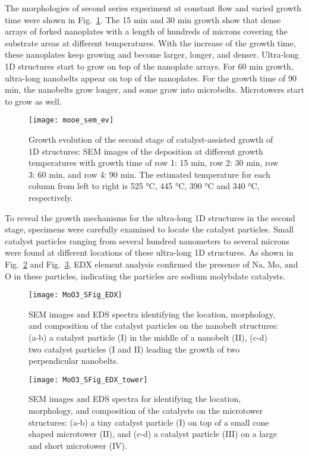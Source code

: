 The morphologies of second series experiment at constant  flow and varied growth time were shown in Fig.~\ref{fig:ch4ev}. The 15 min and 30 min growth show that dense arrays of  forked nanoplates with a length of hundreds of microns covering the substrate areas at different temperatures. With the increase of the growth time, these nanoplates keep growing and become larger, longer, and denser. Ultra-long 1D  structures start to grow on top of the nanoplate arrays. For 60 min growth, ultra-long nanobelts appear on top of the nanoplates. For the growth time of 90 min, the nanobelts grow longer, and some grow into microbelts. Microtowers start to grow as well.

\begin{figure}[htb]
\centering
\texttt{[image: mooe\_sem\_ev]}
\caption[Growth evolution of : second stage]{Growth evolution of the second stage of catalyst-assisted growth of  1D structures: SEM images of the deposition at different growth temperatures with growth time of row 1: 15 min, row 2: 30 min, row 3: 60 min, and row 4: 90 min. The estimated temperature for each column from left to right is 525 \si{\degreeCelsius}, 445 \si{\degreeCelsius}, 390 \si{\degreeCelsius} and 340 \si{\degreeCelsius}, respectively. }
\label{fig:ch4ev}
\end{figure}


To reveal the growth mechanisms for the ultra-long 1D structures in the second stage, specimens were carefully examined to locate the catalyst particles. Small catalyst particles ranging from several hundred nanometers to several microns were found at different locations of these ultra-long 1D structures. As shown in Fig.~\ref{fig:ch4edx1} and Fig.~\ref{fig:ch4edx2}, EDX element analysis confirmed the presence of Na, Mo, and O in these particles, indicating the particles are sodium molybdate catalysts.  

\begin{figure}[htb]
\centering
\texttt{[image: MoO3\_SFig\_EDX]}
\caption[Growth evolution of : second stage]{SEM images and EDS spectra identifying the location, morphology, and composition of the catalyst particles on the nanobelt structures: (a-b) a catalyst particle (I) in the middle of a nanobelt (II), (c-d) two catalyst particles (I and II) leading the growth of two perpendicular nanobelts. }
\label{fig:ch4edx1}
\end{figure}


\begin{figure}[htb]
\centering
\texttt{[image: MoO3\_SFig\_EDX\_tower]}
\caption[Growth evolution of : second stage]{SEM images and EDS spectra for identifying the location, morphology, and composition of the catalysts on the microtower structures: (a-b) a tiny catalyst particle (I) on top of a small cone shaped microtower (II), and (c-d) a catalyst particle (III) on a large and short microtower (IV).}
\label{fig:ch4edx2}
\end{figure}

